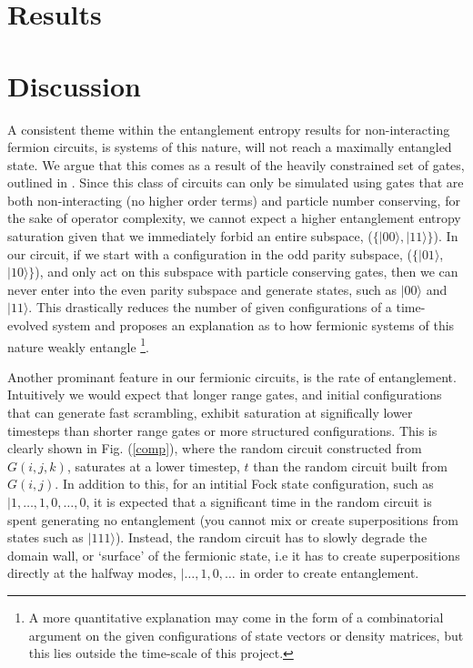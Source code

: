 \documentclass[aps]{revtex4-2}
\begin{document}



\section{Results}



\section{Discussion}

A consistent theme within the entanglement entropy results for non-interacting fermion circuits, is systems of this nature, will not reach a maximally entangled state. We argue that this comes as a result of the heavily constrained set of  gates, outlined in . Since this class of circuits can only be simulated using gates that are both non-interacting (no higher order terms) and particle number conserving, for the sake of operator complexity, we cannot expect a higher entanglement entropy saturation given that we immediately forbid an entire subspace, ($\{|00\rangle, |11\rangle\}$). In our circuit, if we start with a configuration in the odd parity subspace, ($\{|01\rangle$, $|10\rangle\}$), and only act on this subspace with particle conserving gates, then we can never enter into the even parity subspace and generate states, such as $|00\rangle$ and $|11\rangle$. This drastically reduces the number of given configurations of a time-evolved system and proposes an explanation as to how fermionic systems of this nature weakly entangle \footnote{A more quantitative explanation may come in the form of a combinatorial argument on the given configurations of state vectors or density matrices, but this lies outside the time-scale of this project.}.

Another prominant feature in our fermionic circuits, is the rate of entanglement. Intuitively we would expect that longer range gates, and initial configurations that can generate fast scrambling, exhibit saturation at significally lower timesteps than shorter range gates or more structured configurations. This is clearly shown in Fig. (\ref{comp}), where the random circuit constructed from $G(i, j, k)$, saturates at a lower timestep, $t$ than the random circuit built from $G(i, j)$. In addition to this, for an intitial Fock state configuration, such as $|1, \dots, 1, 0, \dots, 0$, it is expected that a significant time in the random circuit is spent generating no entanglement (you cannot mix or create superpositions from states such as $|111\rangle$). Instead, the random circuit has to slowly degrade the domain wall, or `surface' of the fermionic state, i.e it has to create superpositions directly at the halfway modes, $|\dots, 1, 0, \dots$ in order to create entanglement.
\end{document}

